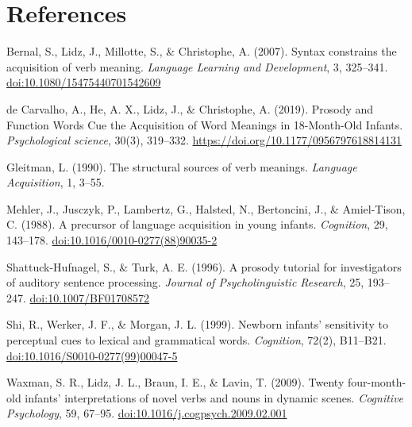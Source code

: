 \documentclass[
  man]{apa6}
\begin{document}
\section{References}\label{references}

Bernal, S., Lidz, J., Millotte, S., \& Christophe, A. (2007). Syntax constrains the acquisition of verb meaning. \emph{Language Learning and Development}, 3, 325--341. \url{doi:10.1080/15475440701542609}

de Carvalho, A., He, A. X., Lidz, J., \& Christophe, A. (2019). Prosody and Function Words Cue the Acquisition of Word Meanings in 18-Month-Old Infants. \emph{Psychological science}, 30(3), 319--332. \url{https://doi.org/10.1177/0956797618814131}

Gleitman, L. (1990). The structural sources of verb meanings. \emph{Language Acquisition}, 1, 3--55.

Mehler, J., Jusczyk, P., Lambertz, G., Halsted, N., Bertoncini, J., \& Amiel-Tison, C. (1988). A precursor of language acquisition in young infants. \emph{Cognition}, 29, 143--178. \url{doi:10.1016/0010-0277(88)90035-2}

Shattuck-Hufnagel, S., \& Turk, A. E. (1996). A prosody tutorial for investigators of auditory sentence processing. \emph{Journal of Psycholinguistic Research}, 25, 193--247. \url{doi:10.1007/BF01708572}

Shi, R., Werker, J. F., \& Morgan, J. L. (1999). Newborn infants' sensitivity to perceptual cues to lexical and grammatical words. \emph{Cognition}, 72(2), B11--B21. \url{doi:10.1016/S0010-0277(99)00047-5}

Waxman, S. R., Lidz, J. L., Braun, I. E., \& Lavin, T. (2009). Twenty four-month-old infants' interpretations of novel verbs and nouns in dynamic scenes. \emph{Cognitive Psychology}, 59, 67--95. \url{doi:10.1016/j.cogpsych.2009.02.001}
\end{document}
